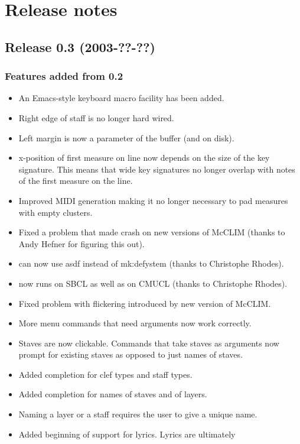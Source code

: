 \chapter{Release notes}

\section{Release 0.3 (2003-??-??)}

\subsection{Features added from 0.2}

\begin{itemize}
\item An Emacs-style keyboard macro facility has been added. 
\item Right edge of staff is no longer hard wired.
\item Left margin is now a parameter of the buffer (and on disk).
\item x-position of first measure on line now depends on the size of
  the key signature.  This means that wide key signatures no longer
  overlap with notes of the first measure on the line.
\item Improved MIDI generation making it no longer necessary to pad 
measures with empty clusters.
\item Fixed a problem that made {\gs} crash on new versions of
  McCLIM (thanks to Andy Hefner for figuring this out). 
\item {\gs} can now use asdf instead of mk:defystem (thanks to
  Christophe Rhodes).
\item {\gs} now runs on SBCL as well as on CMUCL (thanks to Christophe
  Rhodes).
\item Fixed problem with flickering introduced by new version of McCLIM.
\item More menu commands that need arguments now work correctly.
\item Staves are now clickable.  Commands that take staves as
  arguments now prompt for existing staves as opposed to just names of
  staves. 
\item Added completion for clef types and staff types. 
\item Added completion for names of staves and of layers. 
\item Naming a layer or a staff requires the user to give a unique
  name. 
\item Added beginning of support for lyrics. Lyrics are ultimately

\end{itemize}
